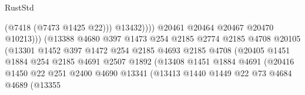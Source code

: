 \begin{lexlean}{RustStd}
\begin{coremodule}
                                                    (@7418 (@7473 @1425 @22)))
                                                  @13432))))
                                          @20461
                                          @20464
                                          @20467
                                          @20470
                                          @10213)))
                                    (@13388
                                      @4680
                                      @397
                                      @1473
                                      @254
                                      @2185
                                      @2774
                                      @2185
                                      @4708
                                      @20105
                                      (@13301
                                        @1452
                                        @397
                                        @1472
                                        @254
                                        @2185
                                        @4693
                                        @2185
                                        @4708
                                        (@20405
                                          @1451
                                          @1884
                                          @254
                                          @2185
                                          @4691
                                          @2507
                                          @1892
                                          (@13408
                                            @1451
                                            @1884
                                            @4691
                                            (@20416
                                              @1450
                                              @22
                                              @251
                                              @2400
                                              @4690
                                              @13341
                                              (@13413
                                                @1440
                                                @1449
                                                @22
                                                @73
                                                @4684
                                                @4689
                                                (@13355

\end{coremodule}
\end{lexlean}
